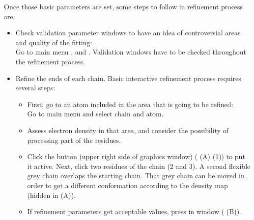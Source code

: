 \begin{itemize}
  Once those basic parameters are set, some steps to follow in refinement process are:\\
  \begin{itemize}
     \item Check validation parameter windows to have an idea of controversial areas and quality of the fitting:\\
     Go to \coot main menu ,  and . Validation windows have to be checked throughout the refinement process.\\
     \item Refine the ends of each chain. Basic interactive refinement process requires several steps:\\
      \begin{itemize}
      \item First, go to an atom included in the area that is going to be refined:\\
      Go to \coot main menu  and select chain and atom.\\
      \item Assess electron density in that area, and consider the possibility of processing part of the residues.\\
      \item Click the button  (upper right side of \coot graphics window)  ( (A) (1)) to put it active. Next, click two residues of the chain (2 and 3). A second flexible grey chain overlaps the starting chain. That grey chain can be moved in order to get a different conformation according to the density map (hidden in  (A)).\\ 
      \item If refinement parameters get acceptable values, press  in  window ( (B)).\\
     

\end{itemize}
\end{itemize}
\end{itemize}
